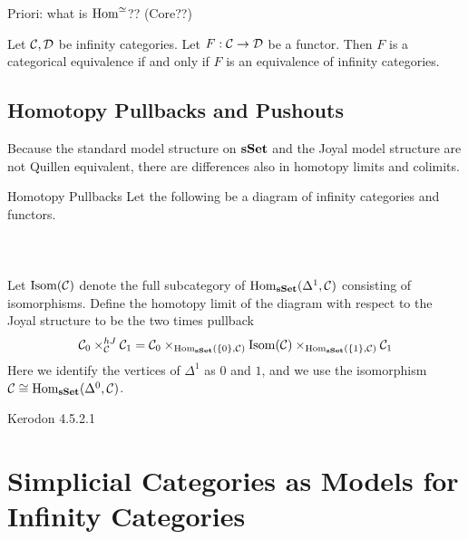 \documentclass[a4paper]{article}
\begin{document}
Priori: what is $\operatorname{Hom}^\simeq$?? (Core??)

\begin{lmm}{}{} Let $\mathcal{C},\mathcal{D}$ be infinity categories. Let $F:\mathcal{C}\to\mathcal{D}$ be a functor. Then $F$ is a categorical equivalence if and only if $F$ is an equivalence of infinity categories. 
\end{lmm}

\subsection{Homotopy Pullbacks and Pushouts}
Because the standard model structure on $\bold{sSet}$ and the Joyal model structure are not Quillen equivalent, there are differences also in homotopy limits and colimits. 

\begin{defn}{Homotopy Pullbacks}{} Let the following be a diagram of infinity categories and functors. \\~\\
\\~\\
Let $\text{Isom}(\mathcal{C})$ denote the full subcategory of $\operatorname{Hom}_\bold{sSet}(\Delta^1,\mathcal{C})$ consisting of isomorphisms. Define the homotopy limit of the diagram with respect to the Joyal structure to be the two times pullback $$\mathcal{C}_0\times_{\mathcal{C}}^{hJ}\mathcal{C}_1=\mathcal{C}_0\times_{\operatorname{Hom}_\bold{sSet}(\{0\},\mathcal{C})}\text{Isom}(\mathcal{C})\times_{\operatorname{Hom}_\bold{sSet}(\{1\},\mathcal{C})}\mathcal{C}_1$$ Here we identify the vertices of $\Delta^1$ as $0$ and $1$, and we use the isomorphism $\mathcal{C}\cong\operatorname{Hom}_\bold{sSet}(\Delta^0,\mathcal{C})$. 
\end{defn}

Kerodon 4.5.2.1

\pagebreak
\section{Simplicial Categories as Models for Infinity Categories}
\end{document}
